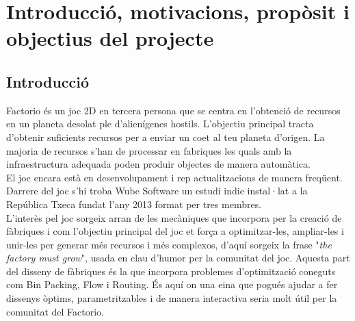 


\chapter{Introducció, motivacions, propòsit i objectius del projecte} %

\label{Chapter1} %


\section{Introducció}
Factorio \cite{FactorioGame} és un joc 2D en tercera persona que se centra en l'obtenció de recursos en un planeta desolat ple d'alienígenes hostils. L'objectiu principal tracta d'obtenir suficients recursos per a enviar un coet al teu planeta d'origen. La majoria de recursos s'han de processar en fabriques les quals amb la infraestructura adequada poden produir objectes de manera automàtica.\\

El joc encara està en desenvolupament i rep actualitzacions de manera freqüent. Darrere del joc s'hi troba Wube Software un estudi indie instal·lat a la República Txeca fundat l'any 2013 format per tres membres.\\

L'interès pel joc sorgeix arran de les mecàniques que incorpora per la creació de fàbriques i com l'objectiu principal del joc et força a optimitzar-les, ampliar-les i unir-les per generar més recursos i més complexos, d'aquí sorgeix la frase "\textit{the factory must grow}", usada en clau d'humor per la comunitat del joc. Aquesta part del disseny de fàbriques és la que incorpora problemes d'optimització coneguts com Bin Packing, Flow i Routing. És aquí on una eina que pogués ajudar a fer dissenys òptims, parametritzables i de manera interactiva seria molt útil per la comunitat del Factorio.\\

